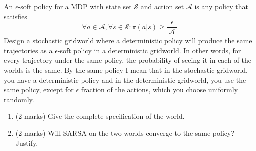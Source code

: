 \documentclass[addpoints,12pt,solution]{exam}
\begin{document}
\begin{questions}
\begin{solution}
\end{solution}


\question[4] An $\epsilon$-soft policy for a MDP with state set $\mathcal{S}$ and action set $\mathcal{A}$ is any policy that satisfies \[\forall a\in \mathcal{A}, \forall s \in \mathcal{S}: \pi(a|s)\geq \frac{\epsilon}{|\mathcal{A}|}\]
Design a stochastic gridworld where a deterministic policy will produce
the same trajectories as a $\epsilon$-soft policy in a deterministic
gridworld. In other words, for every trajectory under the same policy, the
probability of seeing it in each of the worlds is the same. By the same policy I mean
that in the stochastic gridworld, you have a deterministic policy and in the
deterministic gridworld, you use the same policy, except for $\epsilon$ fraction of
the actions, which you choose uniformly randomly. 
\begin{enumerate}[label=(\alph*)]
\item (2 marks) Give the complete specification of the world.


\begin{solution}
\end{solution}


\item (2 marks) Will SARSA on the two worlds converge to the same policy? Justify.

\begin{solution}
\end{solution}

\end{enumerate}


\end{questions}
\end{document}
